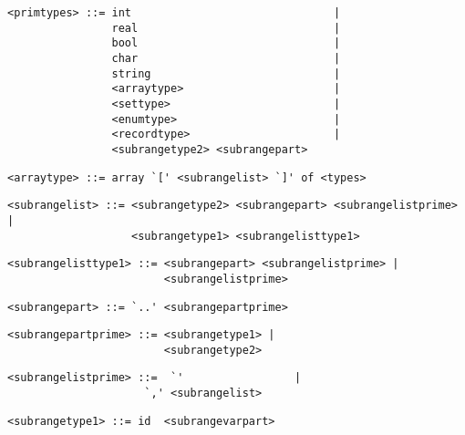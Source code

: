 \begin{footnotesize}
\begin{lstlisting}[frame=single, label={primtypes}, language=pie]
<primtypes> ::= int                               |
                real                              |
                bool                              |
                char                              |
                string                            |
                <arraytype>                       |
                <settype>                         |
                <enumtype>                        |
                <recordtype>                      |
                <subrangetype2> <subrangepart>
\end{lstlisting}

\begin{lstlisting}[frame=single, label={arraytype}, language=pie]
<arraytype> ::= array `[' <subrangelist> `]' of <types>
\end{lstlisting}

\begin{lstlisting}[frame=single, label={subrangelist}, language=pie]
<subrangelist> ::= <subrangetype2> <subrangepart> <subrangelistprime> |
                   <subrangetype1> <subrangelisttype1>
\end{lstlisting}

\begin{lstlisting}[frame=single, label={subrangelisttype1}, language=pie]
<subrangelisttype1> ::= <subrangepart> <subrangelistprime> |
                        <subrangelistprime>
\end{lstlisting}

\begin{lstlisting}[frame=single, label={subrangepart}, language=pie]
<subrangepart> ::= `..' <subrangepartprime> 
\end{lstlisting}

\begin{lstlisting}[frame=single, label={subrangepartprime}, language=pie]
<subrangepartprime> ::= <subrangetype1> |
                        <subrangetype2>
\end{lstlisting}

\begin{lstlisting}[frame=single, label={subrangelistprime}, language=pie]
<subrangelistprime> ::=  `'                 |
	                 `,' <subrangelist>
\end{lstlisting}

\begin{lstlisting}[frame=single, label={subrangetype}, language=pie]
<subrangetype1> ::= id  <subrangevarpart>
\end{lstlisting}


\end{footnotesize}
